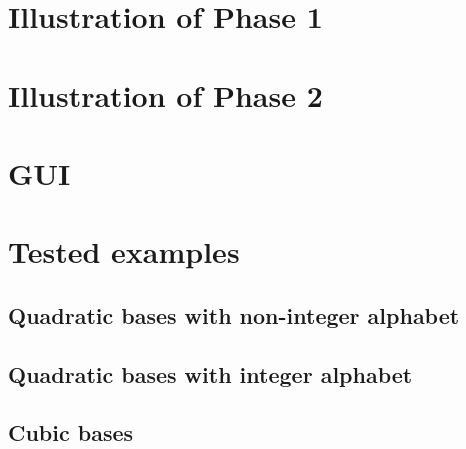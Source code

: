 \section{Illustration of Phase 1}
\section{Illustration of Phase 2}

\section{GUI}
\section{Tested examples}

\subsection*{Quadratic bases with non-integer alphabet}


\subsection*{Quadratic bases with integer alphabet}


\subsection*{Cubic bases}
